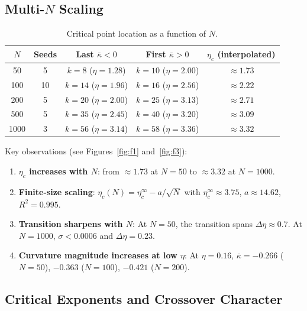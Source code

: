 \documentclass[12pt]{article}
\newcommand{\kbar}{\bar{\kappa}}
\newcommand{\etac}{\eta_c}
\begin{document}
\subsection{Multi-$N$ Scaling}

\begin{table}[ht]
\centering
\caption{Critical point location as a function of $N$.}
\label{tab:multN}
\begin{tabular}{ccccc}
\toprule
$N$ & Seeds & Last $\kbar < 0$ & First $\kbar > 0$ & $\etac$ (interpolated) \\
\midrule
50   & 5  & $k=8$ ($\eta=1.28$)  & $k=10$ ($\eta=2.00$) & $\approx 1.73$ \\
100  & 10 & $k=14$ ($\eta=1.96$) & $k=16$ ($\eta=2.56$) & $\approx 2.22$ \\
200  & 5  & $k=20$ ($\eta=2.00$) & $k=25$ ($\eta=3.13$) & $\approx 2.71$ \\
500  & 5  & $k=35$ ($\eta=2.45$) & $k=40$ ($\eta=3.20$) & $\approx 3.09$ \\
1000 & 3  & $k=56$ ($\eta=3.14$) & $k=58$ ($\eta=3.36$) & $\approx 3.32$ \\
\bottomrule
\end{tabular}
\end{table}

Key observations (see Figures~\ref{fig:f1} and~\ref{fig:f3}):
\begin{enumerate}
  \item \textbf{$\etac$ increases with $N$}: from $\approx 1.73$ at $N=50$ to
  $\approx 3.32$ at $N=1000$.

  \item \textbf{Finite-size scaling}: $\etac(N) = \etac^\infty - a/\sqrt{N}$ with
  $\etac^\infty \approx 3.75$, $a \approx 14.62$, $R^2 = 0.995$.

  \item \textbf{Transition sharpens with $N$}: At $N=50$, the transition spans
  $\Delta\eta \approx 0.7$. At $N=1000$, $\sigma < 0.0006$ and $\Delta\eta = 0.23$.

  \item \textbf{Curvature magnitude increases at low $\eta$}: At $\eta = 0.16$,
  $\kbar = -0.266$ ($N=50$), $-0.363$ ($N=100$), $-0.421$ ($N=200$).
\end{enumerate}

\subsection{Critical Exponents and Crossover Character}
\end{document}
